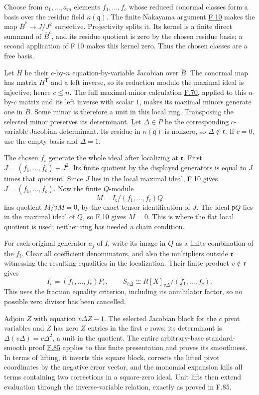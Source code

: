 \documentclass[11pt,a4paper,openany]{report}
\begin{document}
Choose from \(a_1,\ldots,a_m\) elements \(f_1,\ldots,f_c\) whose reduced conormal classes form a basis over the residue field \(\kappa(\mathfrak q)\). The finite Nakayama argument \hyperref[AG-RG-S05-algebra-lemma-NAK]{F.10} makes the map \(\bar B^c\to J/J^2\) surjective. Projectivity splits it. Its kernel is a finite direct summand of \(\bar B^c\), and its residue quotient is zero by the chosen residue basis; a second application of F.10 makes this kernel zero. Thus the chosen classes are a free basis.

Let \(H\) be their \(c\)-by-\(n\) equation-by-variable Jacobian over \(\bar B\). The conormal map has matrix \(H^{\mathsf T}\) and a left inverse, so its reduction modulo the maximal ideal is injective; hence \(c\leq n\). The full maximal-minor calculation \hyperref[AG-RG-S05-algebra-lemma-matrix-left-inverse]{F.70}, applied to this \(n\)-by-\(c\) matrix and its left inverse with scalar \(1\), makes its maximal minors generate one in \(\bar B\). Some minor is therefore a unit in this local ring. Transposing the selected minor preserves its determinant. Let \(\Delta\in P\) be the corresponding \(c\)-variable Jacobian determinant. Its residue in \(\kappa(\mathfrak q)\) is nonzero, so \(\Delta\notin\mathfrak r\). If \(c=0\), use the empty basis and \(\Delta=1\).

The chosen \(f_i\) generate the whole ideal after localizing at \(\mathfrak r\). First \(J=(\bar f_1,\ldots,\bar f_c)+J^2\). Its finite quotient by the displayed generators is equal to \(J\) times that quotient. Since \(J\) lies in the local maximal ideal, F.10 gives \(J=(\bar f_1,\ldots,\bar f_c)\). Now the finite \(Q\)-module \[M=I_{\mathfrak r}/(f_1,\ldots,f_c)Q\] has quotient \(M/\mathfrak pM=0\), by the exact tensor identification of \(J\). The ideal \(\mathfrak pQ\) lies in the maximal ideal of \(Q\), so F.10 gives \(M=0\). This is where the flat local quotient is used; neither ring has needed a chain condition.

For each original generator \(a_j\) of \(I\), write its image in \(Q\) as a finite combination of the \(f_i\). Clear all coefficient denominators, and also the multipliers outside \(\mathfrak r\) witnessing the resulting equalities in the localization. Their finite product \(v\notin\mathfrak r\) gives \[I_v=(f_1,\ldots,f_c)P_v,\qquad
S_{\bar v\bar\Delta}\cong R[X]_{v\Delta}/(f_1,\ldots,f_c).\] This uses the fraction equality criterion, including its annihilator factor, so no possible zero divisor has been cancelled.

Adjoin \(Z\) with equation \(v\Delta Z-1\). The selected Jacobian block for the \(c\) pivot variables and \(Z\) has zero \(Z\) entries in the first \(c\) rows; its determinant is \(\Delta(v\Delta)=v\Delta^2\), a unit in the quotient. The entire arbitrary-base standard-smooth proof \hyperref[AG-RG-S05-algebra-lemma-standard-smooth]{F.85} applies to this finite presentation and proves its smoothness. In terms of lifting, it inverts this square block, corrects the lifted pivot coordinates by the negative error vector, and the monomial expansion kills all terms containing two corrections in a square-zero ideal. Unit lifts then extend evaluation through the inverse-variable relation, exactly as proved in F.85.
\end{document}
